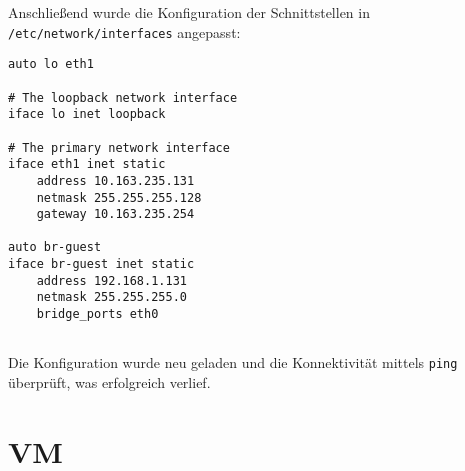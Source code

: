Anschließend wurde die Konfiguration der Schnittstellen in \verb#/etc/network/interfaces# angepasst:
\setupVerbatimOut
\begin{verbatim}
auto lo eth1

# The loopback network interface
iface lo inet loopback

# The primary network interface
iface eth1 inet static
    address 10.163.235.131
    netmask 255.255.255.128
	gateway 10.163.235.254

auto br-guest
iface br-guest inet static
	address 192.168.1.131
	netmask 255.255.255.0
	bridge_ports eth0
    
\end{verbatim}

Die Konfiguration wurde neu geladen und die Konnektivität mittels \verb#ping# überprüft, was erfolgreich verlief.

\chapter{VM}


